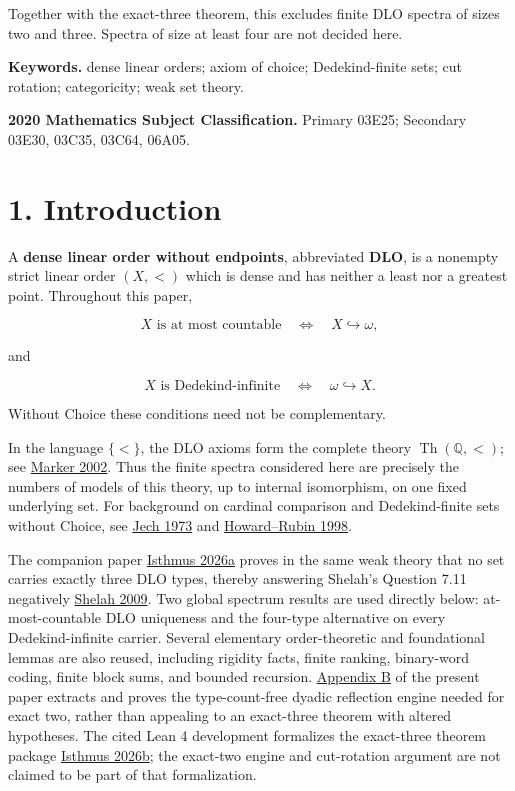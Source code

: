 \documentclass[
  english,
  11pt,
  reqno]{amsart}
\newcounter{none} %
\begin{document}
Together with the exact-three theorem, this excludes finite DLO spectra
of sizes two and three. Spectra of size at least four are not decided
here.

\textbf{Keywords.} dense linear orders; axiom of choice; Dedekind-finite
sets; cut rotation; categoricity; weak set theory.

\textbf{2020 Mathematics Subject Classification.} Primary 03E25;
Secondary 03E30, 03C35, 03C64, 06A05.

\tableofcontents

\protect{}\label{sec:introduction}

\section{1. Introduction}\label{introduction}

A \textbf{dense linear order without endpoints}, abbreviated
\textbf{DLO}, is a nonempty strict linear order \((X,<)\) which is dense
and has neither a least nor a greatest point. Throughout this paper,

\[
X\text{ is at most countable}
\quad\Longleftrightarrow\quad
X\hookrightarrow\omega,
\]

and

\[
X\text{ is Dedekind-infinite}
\quad\Longleftrightarrow\quad
\omega\hookrightarrow X.
\]

Without Choice these conditions need not be complementary.

In the language \(\{<\}\), the DLO axioms form the complete theory
\(\operatorname{Th}(\mathbb Q,<)\); see \hyperref[ref:marker2002]{Marker
2002}. Thus the finite spectra considered here are precisely the numbers
of models of this theory, up to internal isomorphism, on one fixed
underlying set. For background on cardinal comparison and
Dedekind-finite sets without Choice, see \hyperref[ref:jech1973]{Jech
1973} and \hyperref[ref:howardrubin1998]{Howard--Rubin 1998}.

The companion paper \hyperref[ref:isthmus2026a]{Isthmus 2026a} proves in
the same weak theory that no set carries exactly three DLO types,
thereby answering Shelah's Question 7.11 negatively
\hyperref[ref:shelah2009]{Shelah 2009}. Two global spectrum results are
used directly below: at-most-countable DLO uniqueness and the four-type
alternative on every Dedekind-infinite carrier. Several elementary
order-theoretic and foundational lemmas are also reused, including
rigidity facts, finite ranking, binary-word coding, finite block sums,
and bounded recursion. \hyperref[app:dyadic-engine]{Appendix B} of the
present paper extracts and proves the type-count-free dyadic reflection
engine needed for exact two, rather than appealing to an exact-three
theorem with altered hypotheses. The cited Lean 4 development formalizes
the exact-three theorem package \hyperref[ref:isthmus2026b]{Isthmus
2026b}; the exact-two engine and cut-rotation argument are not claimed
to be part of that formalization.
\end{document}
